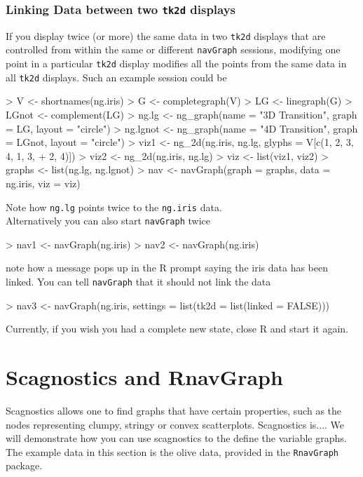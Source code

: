 \documentclass[12pt,oneside,titlepage,letter]{article}
\newcommand{\modify}[1]{{\color{blue}#1}}
\begin{document}
\subsubsection{Linking Data between two \texttt{tk2d} displays}
If you display twice (or more) the same data in two \texttt{tk2d} displays that are controlled from within the same or different \texttt{navGraph} sessions, modifying one point in a particular \texttt{tk2d} display modifies all the points from the same data in all \texttt{tk2d} displays. Such an example session could be
\begin{Schunk}
\begin{Sinput}
> V <- shortnames(ng.iris)
> G <- completegraph(V)
> LG <- linegraph(G)
> LGnot <- complement(LG)
> ng.lg <- ng_graph(name = "3D Transition", graph = LG, layout = "circle")
> ng.lgnot <- ng_graph(name = "4D Transition", graph = LGnot, layout = "circle")
> viz1 <- ng_2d(ng.iris, ng.lg, glyphs = V[c(1, 2, 3, 4, 1, 3, 
+     2, 4)])
> viz2 <- ng_2d(ng.iris, ng.lg)
> viz <- list(viz1, viz2)
> graphs <- list(ng.lg, ng.lgnot)
> nav <- navGraph(graph = graphs, data = ng.iris, viz = viz)
\end{Sinput}
\end{Schunk}
Note how \texttt{ng.lg} points twice to the \texttt{ng.iris} data.\\

Alternatively you can also start \texttt{navGraph} twice

\begin{Schunk}
\begin{Sinput}
> nav1 <- navGraph(ng.iris)
> nav2 <- navGraph(ng.iris)
\end{Sinput}
\end{Schunk}
note how a message pops up in the R prompt saying the iris data has been linked. You can tell \texttt{navGraph} that it should not link the data

\begin{Schunk}
\begin{Sinput}
> nav3 <- navGraph(ng.iris, settings = list(tk2d = list(linked = FALSE)))
\end{Sinput}
\end{Schunk}

\modify{Currently, if you wish you had a complete new state, close R and start it again.}


\section{Scagnostics and RnavGraph}
Scagnostics allows one to find graphs that have certain properties, such as the nodes representing clumpy, stringy or convex scatterplots. \modify{Scagnostics is...}. We will demonstrate how you can use scagnostics to the define the variable graphs. The example data in this section is the olive data, provided in the \texttt{RnavGraph} package.
\begin{Schunk}
\end{Schunk}
\end{document}
